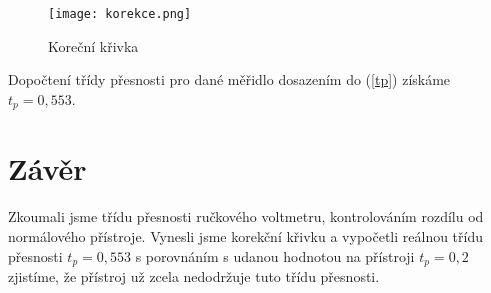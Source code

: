\documentclass[12pt,a4paper]{report}
\begin{document}
\begin{figure}
    \centering
    \texttt{[image: korekce.png]}
    \caption{Koreční křivka}
    \label{fig:korecke}
\end{figure}

\noindent
Dopočtení třídy přesnosti pro dané měřidlo dosazením do (\ref{tp}) získáme $t_p=0,553$.


\section*{Závěr}
Zkoumali jsme třídu přesnosti ručkového voltmetru, kontrolováním rozdílu od normálového přístroje. Vynesli jsme korekční křivku a vypočetli reálnou třídu přesnosti $t_p=0,553$ s porovnáním s udanou hodnotou na přístroji $t_p=0,2$  zjistíme, že přístroj už zcela nedodržuje tuto třídu přesnosti. 
\end{document}
